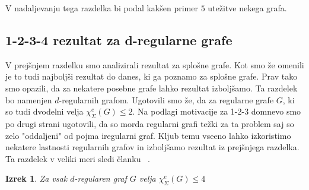\documentclass[12pt,a4paper,twoside]{article}
\theoremstyle{definition} %
\theoremstyle{plain} %
\newtheorem{izrek}[definicija]{Izrek}
\newcommand{\ec}{\chi_{\Sigma}^e}
\numberwithin{equation}{section}  %
\begin{document}
V nadaljevanju tega razdelka bi podal kakšen primer $5$ utežitve nekega grafa.

\subsection{1-2-3-4 rezultat za d-regularne grafe}

V prejšnjem razdelku smo analizirali rezultat za splošne grafe. Kot smo že omenili je to tudi najboljši rezultat do danes, ki ga poznamo za splošne grafe. Prav tako smo opazili, da za nekatere posebne grafe lahko rezultat izboljšamo. Ta razdelek bo namenjen $d$-regularnih grafom. Ugotovili smo že, da za regularne grafe $G$, ki so tudi dvodelni velja $\ec(G) \le 2$. Na podlagi motivacije za 1-2-3 domnevo smo po drugi strani ugotovili, da so morda regularni grafi težki za ta problem saj so zelo "oddaljeni"  od pojma iregularni graf. Kljub temu vseeno lahko izkoristimo nekatere lastnosti regularnih grafov in izboljšamo rezultat iz prejšnjega razdelka. Ta razdelek v veliki meri sledi članku ~\cite{regular}.

\begin{izrek}
Za vsak $d$-regularen graf $G$ velja $\ec(G) \le 4$
\end{izrek}
\end{document}
